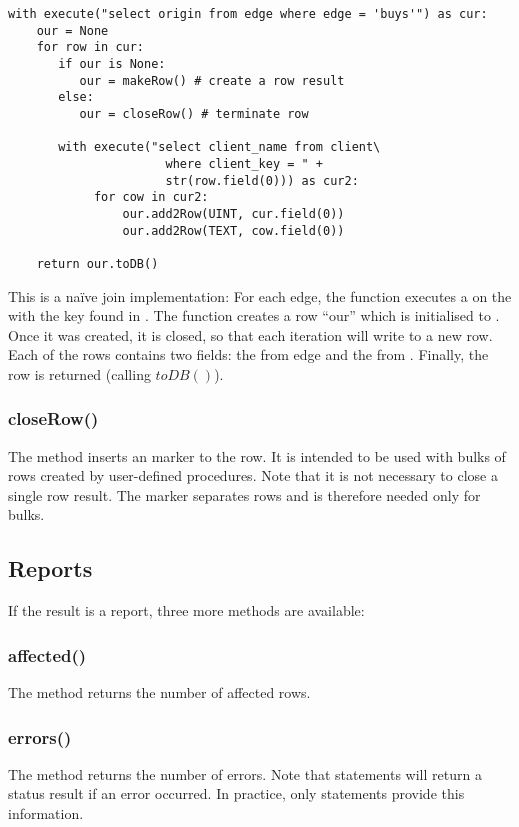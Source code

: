 \begin{python}
\begin{lstlisting}
with execute("select origin from edge where edge = 'buys'") as cur:
    our = None
    for row in cur:
       if our is None:
          our = makeRow() # create a row result
       else:
          our = closeRow() # terminate row

       with execute("select client_name from client\
                      where client_key = " +
                      str(row.field(0))) as cur2:
            for cow in cur2:
                our.add2Row(UINT, cur.field(0))
                our.add2Row(TEXT, cow.field(0))

    return our.toDB() 
\end{lstlisting}
\end{python}

This is a na\"ive join implementation:
For each edge, the function executes a 
on the  with the key found in .
The function creates a row ``our'' which is initialised
to . Once it was created, it is closed,
so that each iteration will write to a new row.
Each of the rows contains two fields: the 
from edge and the  from .
Finally, the row is returned (calling $toDB()$).

\subsubsection{closeRow()}
The method inserts an  marker to the row.
It is intended to be used with bulks of rows created by
user-defined procedures. Note that it is not necessary
to close a single row result. The marker separates
rows and is therefore needed only for bulks.

\subsection{Reports}
If the result is a report,
three more methods are available:

\subsubsection{affected()}
The method returns the number of affected rows.

\subsubsection{errors()}
The method returns the number of errors.
Note that  statements will
return a status result if an error occurred.
In practice, only  statements provide
this information.

